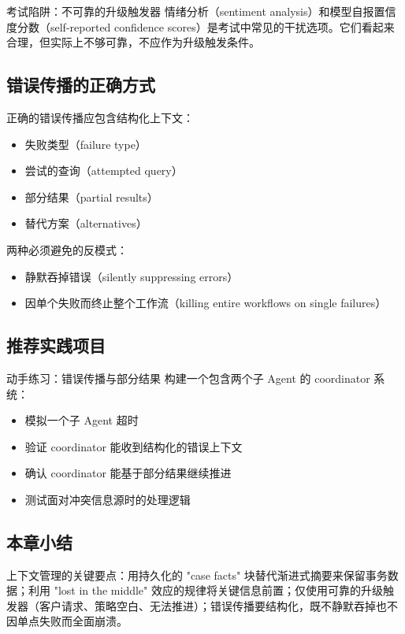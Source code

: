 \begin{warningbox}{考试陷阱：不可靠的升级触发器}
情绪分析（sentiment analysis）和模型自报置信度分数（self-reported confidence scores）是考试中常见的干扰选项。它们看起来合理，但实际上不够可靠，不应作为升级触发条件。
\end{warningbox}

\subsection{错误传播的正确方式}

正确的错误传播应包含结构化上下文：
\begin{itemize}[leftmargin=1.5em]
    \item 失败类型（failure type）
    \item 尝试的查询（attempted query）
    \item 部分结果（partial results）
    \item 替代方案（alternatives）
\end{itemize}

两种必须避免的反模式：
\begin{itemize}[leftmargin=1.5em]
    \item 静默吞掉错误（silently suppressing errors）
    \item 因单个失败而终止整个工作流（killing entire workflows on single failures）
\end{itemize}

\subsection{推荐实践项目}

\begin{knowledgebox}{动手练习：错误传播与部分结果}
构建一个包含两个子 Agent 的 coordinator 系统：
\begin{itemize}[leftmargin=1.5em]
    \item 模拟一个子 Agent 超时
    \item 验证 coordinator 能收到结构化的错误上下文
    \item 确认 coordinator 能基于部分结果继续推进
    \item 测试面对冲突信息源时的处理逻辑
\end{itemize}
\end{knowledgebox}

\subsection{本章小结}

上下文管理的关键要点：用持久化的 "case facts" 块替代渐进式摘要来保留事务数据；利用 "lost in the middle" 效应的规律将关键信息前置；仅使用可靠的升级触发器（客户请求、策略空白、无法推进）；错误传播要结构化，既不静默吞掉也不因单点失败而全面崩溃。

